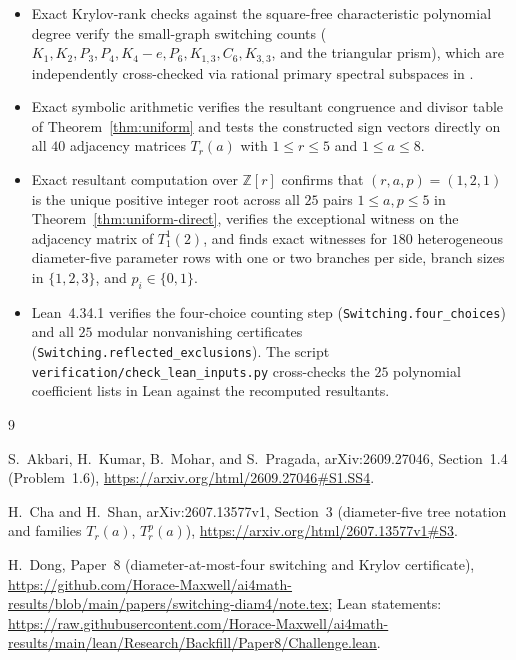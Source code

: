 \documentclass[11pt]{article}
\theoremstyle{plain}
\theoremstyle{remark}
\begin{document}
\begin{itemize}
\item Exact Krylov-rank checks against the square-free characteristic
  polynomial degree verify the small-graph switching counts ($K_1, K_2, P_3,
  P_4, K_4-e, P_6, K_{1,3}, C_6, K_{3,3}$, and the triangular prism), which are
  independently cross-checked via rational primary spectral subspaces in
  .
\item Exact symbolic arithmetic verifies the resultant congruence and divisor
  table of Theorem~\ref{thm:uniform} and tests the constructed sign vectors
  directly on all $40$ adjacency matrices $T_r(a)$ with $1 \leq r \leq 5$ and
  $1 \leq a \leq 8$.
\item Exact resultant computation over $\mathbb{Z}[r]$ confirms that
  $(r,a,p) = (1,2,1)$ is the unique positive integer root across all $25$ pairs
  $1 \leq a,p \leq 5$ in Theorem~\ref{thm:uniform-direct}, verifies the
  exceptional witness on the adjacency matrix of $T_1^1(2)$, and finds exact
  witnesses for $180$ heterogeneous diameter-five parameter rows with one or
  two branches per side, branch sizes in $\{1,2,3\}$, and $p_i \in \{0,1\}$.
\item Lean~4.34.1 verifies the four-choice counting step
  (\texttt{Switching.four\_choices}) and all $25$ modular nonvanishing
  certificates (\texttt{Switching.reflected\_exclusions}). The script
  \texttt{verification/\allowbreak check\_lean\_inputs.py} cross-checks the $25$ polynomial
  coefficient lists in Lean against the recomputed resultants.
\end{itemize}

\begin{thebibliography}{9}

S.~Akbari, H.~Kumar, B.~Mohar, and S.~Pragada,
arXiv:2609.27046, Section~1.4 (Problem~1.6),
\url{https://arxiv.org/html/2609.27046#S1.SS4}.

H.~Cha and H.~Shan,
arXiv:2607.13577v1, Section~3 (diameter-five tree notation and families $T_r(a)$, $T_r^p(a)$),
\url{https://arxiv.org/html/2607.13577v1#S3}.

H.~Dong,
Paper~8 (diameter-at-most-four switching and Krylov certificate),
\url{https://github.com/Horace-Maxwell/ai4math-results/blob/main/papers/switching-diam4/note.tex};
Lean statements:
\url{https://raw.githubusercontent.com/Horace-Maxwell/ai4math-results/main/lean/Research/Backfill/Paper8/Challenge.lean}.

\end{thebibliography}
\end{document}
